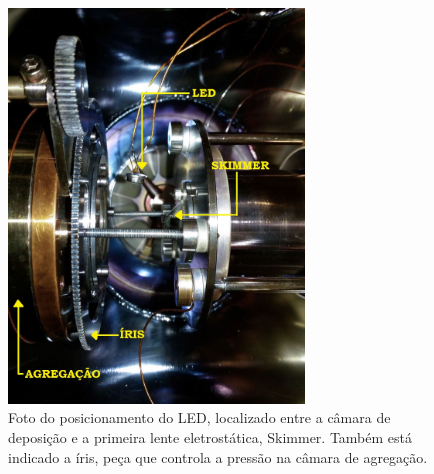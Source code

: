 \begin{figure}
  \centering
  \includegraphics[width=0.7\textwidth]{images/led_montagem}
  \caption{Foto do posicionamento do LED, localizado entre a câmara de deposição e a primeira lente eletrostática, Skimmer. Também está indicado a íris, peça que controla a pressão na câmara de agregação.}
  \label{fig:led_montagem}
\end{figure}


